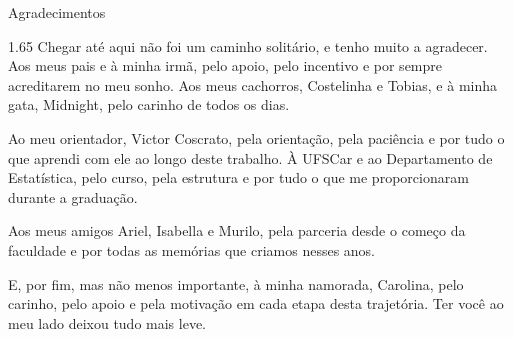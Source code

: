 \clearpage{\thispagestyle{empty}\origcleardoublepage}
\thispagestyle{empty}
\vspace*{1cm}

\begin{center}
{\LARGE Agradecimentos}
\end{center}
\vspace*{1.6cm}

\begin{spacing}{1.65}
Chegar até aqui não foi um caminho solitário, e tenho muito a agradecer. Aos meus pais e à minha irmã, pelo apoio, pelo incentivo e por sempre acreditarem no meu sonho. Aos meus cachorros, Costelinha e Tobias, e à minha gata, Midnight, pelo carinho de todos os dias.

Ao meu orientador, Victor Coscrato, pela orientação, pela paciência e por tudo o que aprendi com ele ao longo deste trabalho. À UFSCar e ao Departamento de Estatística, pelo curso, pela estrutura e por tudo o que me proporcionaram durante a graduação.

Aos meus amigos Ariel, Isabella e Murilo, pela parceria desde o começo da faculdade e por todas as memórias que criamos nesses anos.

E, por fim, mas não menos importante, à minha namorada, Carolina, pelo carinho, pelo apoio e pela motivação em cada etapa desta trajetória. Ter você ao meu lado deixou tudo mais leve.
\end{spacing}
